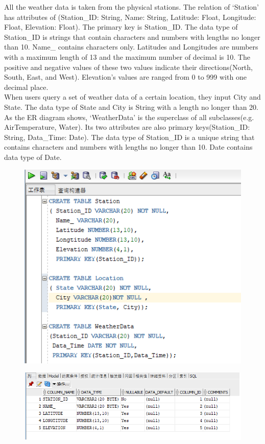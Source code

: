 \documentclass[]{article}
\begin{document}
	\noindent All the weather data is taken from the physical stations. The relation of ‘Station’ has attributes of (Station\_ID: String, Name: String, Latitude: Float, Longitude: Float, Elevation: Float). The primary key is Station\_ID. The data type of Station\_ID is strings that contain characters and numbers with lengths no longer than 10. Name\_ contains characters only. Latitudes and Longitudes are numbers with a maximum length of 13 and the maximum number of decimal is 10. The positive and negative values of these two values indicate their directions(North, South, East, and West). Elevation’s values are ranged from 0 to 999 with one decimal place.    \\
	
	\noindent When users query a set of weather data of a certain location, they input City and State. The data type of State and City is String with a length no longer than 20.   \\
	
	\noindent As the ER diagram shows, ‘WeatherData’ is the superclass of all subclasses(e.g. AirTemperature, Water). Its two attributes are also primary keys(Station\_ID: String, Data\_Time: Date). The data type of Station\_ID is a unique string that contains characters and numbers with lengths no longer than 10. Date contains data type of Date.    \\

	\begin{figure}[H]
		\centering
		\includegraphics[width=0.7\linewidth, height=0.4\textheight]{../d3-p/part2}
		\caption{}
		\label{fig:part2}
	\end{figure}
	
	\begin{figure}[H]
		\centering
		\includegraphics[width=0.7\linewidth]{../d3-p/part2-1}
		\caption{}
		\label{fig:part2-1}
	\end{figure}
	
\end{document}
